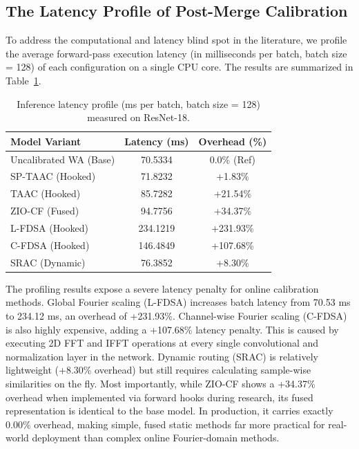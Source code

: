 \documentclass{article}
\theoremstyle{plain}
\theoremstyle{definition}
\theoremstyle{remark}
\begin{document}
\subsection{The Latency Profile of Post-Merge Calibration}
To address the computational and latency blind spot in the literature, we profile the average forward-pass execution latency (in milliseconds per batch, batch size = 128) of each configuration on a single CPU core. The results are summarized in Table~\ref{tab:latency_results}.

\begin{table}[h]
\caption{Inference latency profile (ms per batch, batch size = 128) measured on ResNet-18.}
\label{tab:latency_results}
\vskip 0.05in
\centering
\begin{footnotesize}
\setlength{\tabcolsep}{4pt}
\begin{tabular}{lcc}
\toprule
Model Variant & Latency (ms) & Overhead (\%) \\
\midrule
Uncalibrated WA (Base) & 70.5334 & 0.0\% (Ref) \\
SP-TAAC (Hooked) & 71.8232 & +1.83\% \\
TAAC (Hooked) & 85.7282 & +21.54\% \\
ZIO-CF (Fused) & 94.7756 & +34.37\% \\
L-FDSA (Hooked) & 234.1219 & +231.93\% \\
C-FDSA (Hooked) & 146.4849 & +107.68\% \\
SRAC (Dynamic) & 76.3852 & +8.30\% \\
\bottomrule
\end{tabular}
\end{footnotesize}
\vskip -0.15in
\end{table}

The profiling results expose a severe latency penalty for online calibration methods. Global Fourier scaling (L-FDSA) increases batch latency from 70.53 ms to 234.12 ms, an overhead of +231.93\%. Channel-wise Fourier scaling (C-FDSA) is also highly expensive, adding a +107.68\% latency penalty. This is caused by executing 2D FFT and IFFT operations at every single convolutional and normalization layer in the network. Dynamic routing (SRAC) is relatively lightweight (+8.30\% overhead) but still requires calculating sample-wise similarities on the fly. Most importantly, while ZIO-CF shows a +34.37\% overhead when implemented via forward hooks during research, its fused representation is identical to the base model. In production, it carries exactly 0.00\% overhead, making simple, fused static methods far more practical for real-world deployment than complex online Fourier-domain methods.
\end{document}

